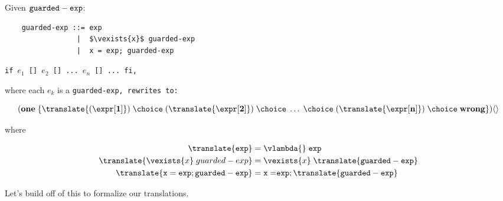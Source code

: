 \documentclass[]{article}
\begin{document}
Given $\tt{guarded-exp}$:

\begin{lstlisting}
    guarded-exp ::= exp
                 |  $\vexists{x}$ guarded-exp
                 |  x = exp; guarded-exp

\end{lstlisting}

\tt{if $e_1$ [] $e_2$ [] ... $e_n$ [] ... fi},

where each $e_k$ is a \tt{guarded-exp}, rewrites to: 

$$
(\bf{one}\; \{\translate{(\expr[1]})
\; \choice\; (\translate{\expr[2]}) 
\; \choice\; \dots\; \choice\; 
(\translate{\expr[n]}) 
\; \choice\; \bf{wrong} \})
 \langle\rangle  \\
$$  

where

\begin{align}    
    \translate{\tt{exp}} &= \vlambda{}\; {\tt{exp}} \\
    \translate{\vexists{x}\; {guarded-exp}} 
    &= \vexists{x}\; \translate{\tt{guarded-exp}} \\
    \translate{\tt{x = exp; guarded-exp}} 
    &= \tt{x = } \tt{exp}; \translate{\tt{guarded-exp}}
\end{align}

Let's build off of this to formalize our translations. 
\end{document}
